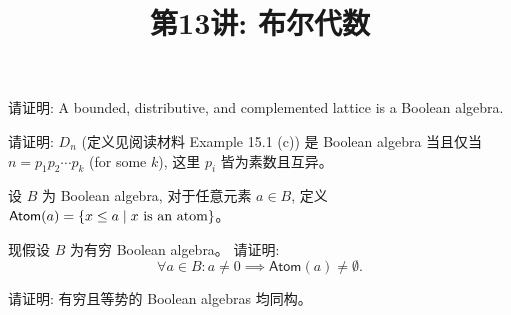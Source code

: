 \documentclass[a4paper, justified]{tufte-handout}
\title{第13讲: 布尔代数}
\date{\zhtoday} %
\begin{document}
\maketitle
\noplagiarism %
\begin{abstract}
\end{abstract}
\beginrequired

\begin{problem}[Definition]
  请证明: A bounded, distributive, and complemented lattice is a Boolean algebra. 
\end{problem}

\begin{solution}
\end{solution}

\begin{problem}[$D_{n}$]
  请证明: $D_{n}$ (定义见阅读材料 Example 15.1 (c)) 
  是 Boolean algebra 当且仅当 $n = p_1 p_2 \cdots p_k$ (for some $k$), 
  这里 $p_i$ 皆为素数且互异。
\end{problem}

\begin{solution}
\end{solution}

\begin{problem}[Atom]
  设 $B$ 为 Boolean algebra, 对于任意元素 $a \in B$,
  定义 $\textsf{Atom}(a) = \{x \le a \mid x \text{ is an atom}\}$。

  \noindent 现假设 $B$ 为有穷 Boolean algebra。
  请证明:
  \[
    \forall a \in B: a \neq 0 \implies \textsf{Atom}(a) \neq \emptyset.
  \]
\end{problem}

\begin{solution}
\end{solution}

\begin{problem}[Isomorphic]
  请证明: 有穷且等势的 Boolean algebras 均同构。
\end{problem}
\end{document}
